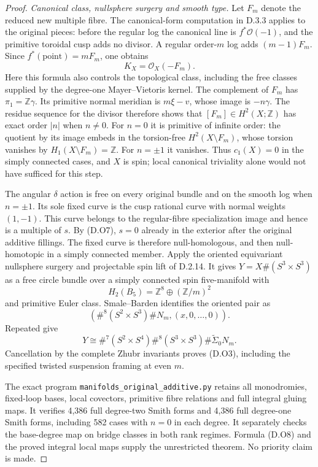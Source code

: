 \begin{proof}
\emph{Canonical class, nullsphere surgery and smooth type.}
Let $F_m$ denote the reduced new multiple fibre.
The canonical-form computation in D.3.3 applies to the
original pieces: before the regular log the canonical
line is $f^*\mathcal O(-1)$, and the primitive toroidal
cusp adds no divisor. A regular order-$m$ log adds
$(m-1)F_m$. Since $f^*(\mathrm{point})=mF_m$, one obtains
\[
                         K_X=\mathcal O_X(-F_m).
 \tag{D.O9}
\]
Here this formula also controls the topological class,
including the free classes supplied by the degree-one
Mayer--Vietoris kernel. The complement of $F_m$ has
$\pi_1=\mathbb Z\gamma$. Its primitive normal meridian
is $m\xi-v$, whose image is $-n\gamma$.
The residue sequence for the divisor therefore shows
that $[F_m]\in H^2(X;\mathbb Z)$ has exact order $|n|$
when $n\ne0$. For $n=0$ it is primitive of infinite
order: the quotient by its image embeds in the torsion-free
$H^2(X\setminus F_m)$, whose torsion vanishes by
$H_1(X\setminus F_m)=\mathbb Z$. For $n=\pm1$ it vanishes. Thus $c_1(X)=0$ in the
simply connected cases, and $X$ is spin; local canonical
triviality alone would not have sufficed for this step.

The angular $\delta$ action is free on every original
bundle and on the smooth log when $n=\pm1$. Its sole
fixed curve is the cusp rational curve with normal
weights $(1,-1)$. This curve belongs to the regular-fibre
specialization image and hence is a multiple of $s$.
By (D.O7), $s=0$ already in the exterior after the
original additive fillings. The fixed curve is therefore
null-homologous, and then null-homotopic in a simply
connected member.
Apply the oriented equivariant nullsphere surgery and
projectable spin lift of D.2.14. It gives
$Y=X\#(S^3\times S^3)$ as a free circle bundle over a
simply connected spin five-manifold with
\[
            H_2(B_5)=\mathbb Z^8\oplus(\mathbb Z/m)^2
\]
and primitive Euler class. Smale--Barden identifies the
oriented pair as
\[
 (\#^8(S^2\times S^3)\#N_m,(x,0,\ldots,0)).
\]
Repeated \cite[Theorem A and Theorem B(2)]{manGR25}
give
\[
 Y\cong\#^7(S^2\times S^4)\#^8(S^3\times S^3)
                                        \#\widetilde\Sigma_0N_m.
\]
Cancellation by the complete Zhubr invariants proves
(D.O3), including the specified twisted suspension
framing at even $m$.

The exact program \texttt{manifolds\_original\_additive.py}
retains all monodromies, fixed-loop bases, local covectors,
primitive fibre relations and full integral gluing maps.
It verifies 4,386 full degree-two Smith forms and 4,386
full degree-one Smith forms, including 582 cases with
$n=0$ in each degree. It separately checks the base-degree
map on bridge classes in both rank regimes. Formula
(D.O8) and the proved integral local maps supply the
unrestricted theorem. No priority claim is made.
\end{proof}

